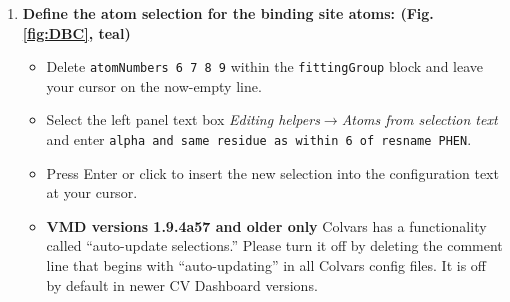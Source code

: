 \documentclass[9pt,tutorial,pubversion]{Styling/livecoms}
\newcommand{\button}[1]{\inlineBox[gray]{\texttt{#1}}}
\newcommand{\menu}[1]{\textit{#1}}
\newcommand{\textInput}[1]{\texttt{#1}}
\begin{document}
\begin{enumerate}
\begin{enumerate}[label=\alph*., ref=\theenumi.\alph*]
            \item \label{step:siteNumbers}\textbf{Define the atom selection for the binding site atoms: (Fig. \ref{fig:DBC}, teal)} 
             \begin{itemize}
                 \item Delete \textInput{atomNumbers 6 7 8 9} within the \textInput{fittingGroup} block and leave your cursor on the now-empty line.
                 \item Select the left panel text box \menu{Editing helpers$\rightarrow$Atoms from selection text} and enter \textInput{alpha and same residue as within 6 of resname PHEN}.
                 \item Press Enter or click \button{Insert [Enter]} to insert the new selection into the configuration text at your cursor.
                 \item \textbf{VMD versions 1.9.4a57 and older only} Colvars has a functionality called ``auto-update selections.'' Please turn it off by deleting the comment line that begins with ``auto-updating'' in all Colvars config files. It is off by default in newer CV Dashboard versions.
            \end{itemize}
        

\end{enumerate}
\end{enumerate}
\end{document}
